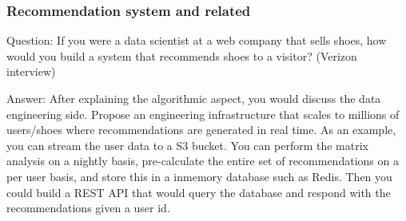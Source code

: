 \documentclass[11pt]{beamer}
\begin{document}
\begin{frame}
\frametitle{Recommendation system and related}
\begin{block}{Question:}
	If you were a data scientist at a web company that sells shoes, how would you build a system that recommends shoes to a visitor? (Verizon interview)
\end{block}
\begin{block}{Answer:}
	After explaining the algorithmic aspect, you would discuss the data engineering side. Propose an engineering infrastructure that scales to millions of users/shoes where recommendations are generated in real time. As an example, you can stream the user data to a S3 bucket. You can perform the matrix analysis on a nightly basis, pre-calculate the entire set of recommendations on a per user basis, and store this in a in­memory database such as Redis. Then you could build a REST API that would query the database and respond with the recommendations given a user id.
\end{block}
\end{frame}
\end{document}
